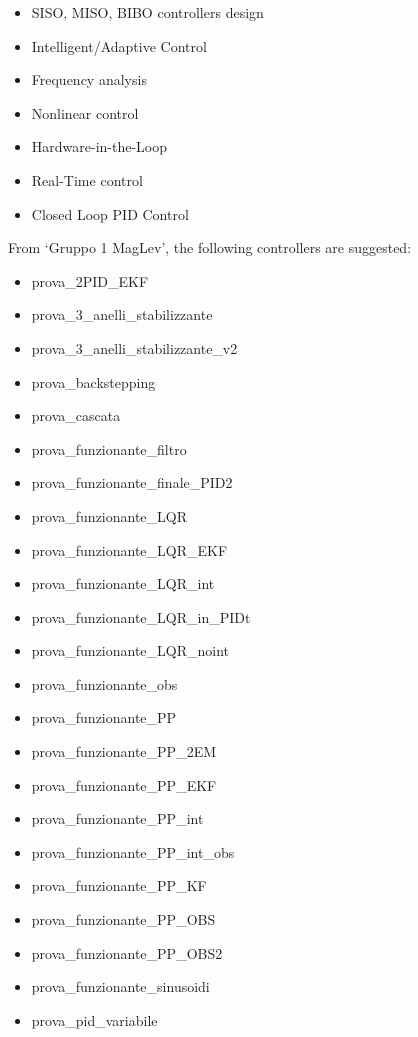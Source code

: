\begin{itemize}
    \item SISO, MISO, BIBO controllers design
    \item Intelligent/Adaptive Control
    \item Frequency analysis
    \item Nonlinear control
    \item Hardware-in-the-Loop
    \item Real-Time control
    \item Closed Loop PID Control
\end{itemize}

From `Gruppo 1 MagLev', the following controllers are suggested:

\begin{itemize}
    \item prova\_2PID\_EKF
    \item prova\_3\_anelli\_stabilizzante
    \item prova\_3\_anelli\_stabilizzante\_v2
    \item prova\_backstepping
    \item prova\_cascata
    \item prova\_funzionante\_filtro
    \item prova\_funzionante\_finale\_PID2
    \item prova\_funzionante\_LQR
    \item prova\_funzionante\_LQR\_EKF
    \item prova\_funzionante\_LQR\_int
    \item prova\_funzionante\_LQR\_in\_PIDt
    \item prova\_funzionante\_LQR\_noint
    \item prova\_funzionante\_obs
    \item prova\_funzionante\_PP
    \item prova\_funzionante\_PP\_2EM
    \item prova\_funzionante\_PP\_EKF
    \item prova\_funzionante\_PP\_int
    \item prova\_funzionante\_PP\_int\_obs
    \item prova\_funzionante\_PP\_KF
    \item prova\_funzionante\_PP\_OBS
    \item prova\_funzionante\_PP\_OBS2
    \item prova\_funzionante\_sinusoidi
    \item prova\_pid\_variabile
\end{itemize}

